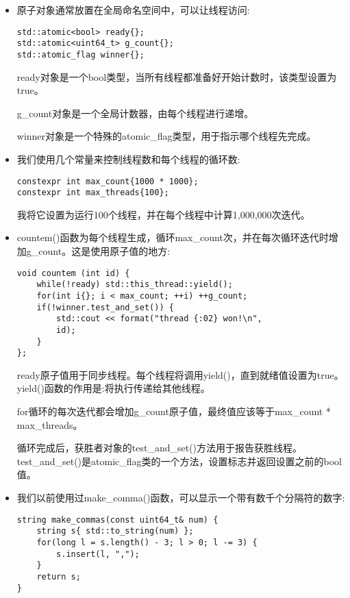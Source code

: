 \begin{itemize}
\item 
原子对象通常放置在全局命名空间中，可以让线程访问:

\begin{lstlisting}[style=styleCXX]
std::atomic<bool> ready{};
std::atomic<uint64_t> g_count{};
std::atomic_flag winner{};
\end{lstlisting}

ready对象是一个bool类型，当所有线程都准备好开始计数时，该类型设置为true。

g\_count对象是一个全局计数器，由每个线程进行递增。

winner对象是一个特殊的atomic\_flag类型，用于指示哪个线程先完成。

\item 
我们使用几个常量来控制线程数和每个线程的循环数:

\begin{lstlisting}[style=styleCXX]
constexpr int max_count{1000 * 1000};
constexpr int max_threads{100};
\end{lstlisting}

我将它设置为运行100个线程，并在每个线程中计算1,000,000次迭代。

\item 
countem()函数为每个线程生成，循环max\_count次，并在每次循环迭代时增加g\_count。这是使用原子值的地方:

\begin{lstlisting}[style=styleCXX]
void countem (int id) {
	while(!ready) std::this_thread::yield();
	for(int i{}; i < max_count; ++i) ++g_count;
	if(!winner.test_and_set()) {
		std::cout << format("thread {:02} won!\n",
		id);
	}
};
\end{lstlisting}

ready原子值用于同步线程。每个线程将调用yield()，直到就绪值设置为true。yield()函数的作用是:将执行传递给其他线程。

for循环的每次迭代都会增加g\_count原子值，最终值应该等于max\_count * max\_threads。

循环完成后，获胜者对象的test\_and\_set()方法用于报告获胜线程。test\_and\_set()是atomic\_flag类的一个方法，设置标志并返回设置之前的bool值。

\item 
我们以前使用过make\_comma()函数，可以显示一个带有数千个分隔符的数字:

\begin{lstlisting}[style=styleCXX]
string make_commas(const uint64_t& num) {
	string s{ std::to_string(num) };
	for(long l = s.length() - 3; l > 0; l -= 3) {
		s.insert(l, ",");
	}
	return s;
}
\end{lstlisting}


\end{itemize}
